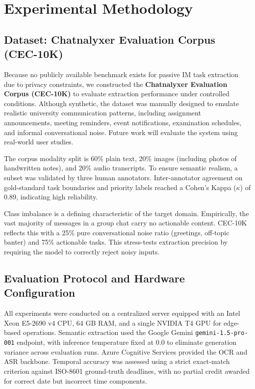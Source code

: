 \section{Experimental Methodology}
\label{sec:experimental_methodology}

\subsection{Dataset: Chatnalyxer Evaluation Corpus (CEC-10K)}
Because no publicly available benchmark exists for passive IM task extraction due to privacy constraints, we constructed the \textbf{Chatnalyxer Evaluation Corpus (CEC-10K)} to evaluate extraction performance under controlled conditions. Although synthetic, the dataset was manually designed to emulate realistic university communication patterns, including assignment announcements, meeting reminders, event notifications, examination schedules, and informal conversational noise. Future work will evaluate the system using real-world user studies.

The corpus modality split is 60\% plain text, 20\% images (including photos of handwritten notes), and 20\% audio transcripts. To ensure semantic realism, a subset was validated by three human annotators. Inter-annotator agreement on gold-standard task boundaries and priority labels reached a Cohen's Kappa ($\kappa$) of 0.89, indicating high reliability. 

Class imbalance is a defining characteristic of the target domain. Empirically, the vast majority of messages in a group chat carry no actionable content. CEC-10K reflects this with a 25\% pure conversational noise ratio (greetings, off-topic banter) and 75\% actionable tasks. This stress-tests extraction precision by requiring the model to correctly reject noisy inputs.

\subsection{Evaluation Protocol and Hardware Configuration}
All experiments were conducted on a centralized server equipped with an Intel Xeon E5-2690 v4 CPU, 64 GB RAM, and a single NVIDIA T4 GPU for edge-based operations. Semantic extraction used the Google Gemini \texttt{gemini-1.5-pro-001} endpoint, with inference temperature fixed at $0.0$ to eliminate generation variance across evaluation runs. Azure Cognitive Services provided the OCR and ASR backbone. Temporal accuracy was assessed using a strict exact-match criterion against ISO-8601 ground-truth deadlines, with no partial credit awarded for correct date but incorrect time components.
